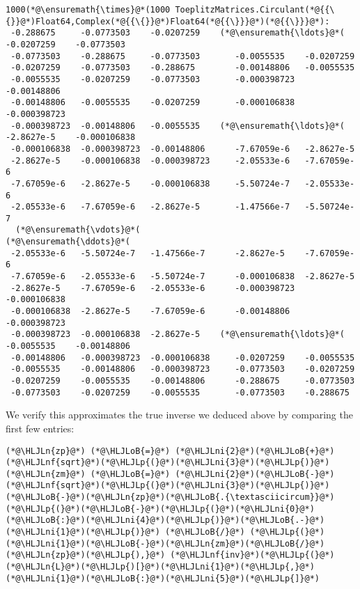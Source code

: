 \documentclass[12pt,landscape]{article}
\newcommand{\HLJLn}[1]{#1}
\newcommand{\HLJLnf}[1]{\textcolor[RGB]{66,102,213}{#1}}
\newcommand{\HLJLni}[1]{\textcolor[RGB]{59,151,46}{#1}}
\newcommand{\HLJLoB}[1]{\textcolor[RGB]{102,102,102}{\textbf{#1}}}
\newcommand{\HLJLp}[1]{#1}
\begin{document}
{\begin{lstlisting}
1000(*@\ensuremath{\times}@*(1000 ToeplitzMatrices.Circulant(*@{{\{}}@*)Float64,Complex(*@{{\{}}@*)Float64(*@{{\}}}@*)(*@{{\}}}@*):
 -0.288675     -0.0773503    -0.0207259    (*@\ensuremath{\ldots}@*(  -0.0207259    -0.0773503
 -0.0773503    -0.288675     -0.0773503       -0.0055535    -0.0207259
 -0.0207259    -0.0773503    -0.288675        -0.00148806   -0.0055535
 -0.0055535    -0.0207259    -0.0773503       -0.000398723  -0.00148806
 -0.00148806   -0.0055535    -0.0207259       -0.000106838  -0.000398723
 -0.000398723  -0.00148806   -0.0055535    (*@\ensuremath{\ldots}@*(  -2.8627e-5    -0.000106838
 -0.000106838  -0.000398723  -0.00148806      -7.67059e-6   -2.8627e-5
 -2.8627e-5    -0.000106838  -0.000398723     -2.05533e-6   -7.67059e-6
 -7.67059e-6   -2.8627e-5    -0.000106838     -5.50724e-7   -2.05533e-6
 -2.05533e-6   -7.67059e-6   -2.8627e-5       -1.47566e-7   -5.50724e-7
  (*@\ensuremath{\vdots}@*(                                        (*@\ensuremath{\ddots}@*(                
 -2.05533e-6   -5.50724e-7   -1.47566e-7      -2.8627e-5    -7.67059e-6
 -7.67059e-6   -2.05533e-6   -5.50724e-7      -0.000106838  -2.8627e-5
 -2.8627e-5    -7.67059e-6   -2.05533e-6      -0.000398723  -0.000106838
 -0.000106838  -2.8627e-5    -7.67059e-6      -0.00148806   -0.000398723
 -0.000398723  -0.000106838  -2.8627e-5    (*@\ensuremath{\ldots}@*(  -0.0055535    -0.00148806
 -0.00148806   -0.000398723  -0.000106838     -0.0207259    -0.0055535
 -0.0055535    -0.00148806   -0.000398723     -0.0773503    -0.0207259
 -0.0207259    -0.0055535    -0.00148806      -0.288675     -0.0773503
 -0.0773503    -0.0207259    -0.0055535       -0.0773503    -0.288675
\end{lstlisting}


We verify this approximates the true inverse we deduced above by comparing the first few entries:


\begin{lstlisting}
(*@\HLJLn{zp}@*) (*@\HLJLoB{=}@*) (*@\HLJLni{2}@*)(*@\HLJLoB{+}@*)(*@\HLJLnf{sqrt}@*)(*@\HLJLp{(}@*)(*@\HLJLni{3}@*)(*@\HLJLp{)}@*)
(*@\HLJLn{zm}@*) (*@\HLJLoB{=}@*) (*@\HLJLni{2}@*)(*@\HLJLoB{-}@*)(*@\HLJLnf{sqrt}@*)(*@\HLJLp{(}@*)(*@\HLJLni{3}@*)(*@\HLJLp{)}@*)
(*@\HLJLoB{-}@*)(*@\HLJLn{zp}@*)(*@\HLJLoB{.{\textasciicircum}}@*)(*@\HLJLp{(}@*)(*@\HLJLoB{-}@*)(*@\HLJLp{(}@*)(*@\HLJLni{0}@*)(*@\HLJLoB{:}@*)(*@\HLJLni{4}@*)(*@\HLJLp{)}@*)(*@\HLJLoB{.-}@*)(*@\HLJLni{1}@*)(*@\HLJLp{)}@*) (*@\HLJLoB{/}@*) (*@\HLJLp{(}@*)(*@\HLJLni{1}@*)(*@\HLJLoB{-}@*)(*@\HLJLn{zm}@*)(*@\HLJLoB{/}@*)(*@\HLJLn{zp}@*)(*@\HLJLp{),}@*) (*@\HLJLnf{inv}@*)(*@\HLJLp{(}@*)(*@\HLJLn{L}@*)(*@\HLJLp{)[}@*)(*@\HLJLni{1}@*)(*@\HLJLp{,}@*)(*@\HLJLni{1}@*)(*@\HLJLoB{:}@*)(*@\HLJLni{5}@*)(*@\HLJLp{]}@*)
\end{lstlisting}

}
\end{document}
